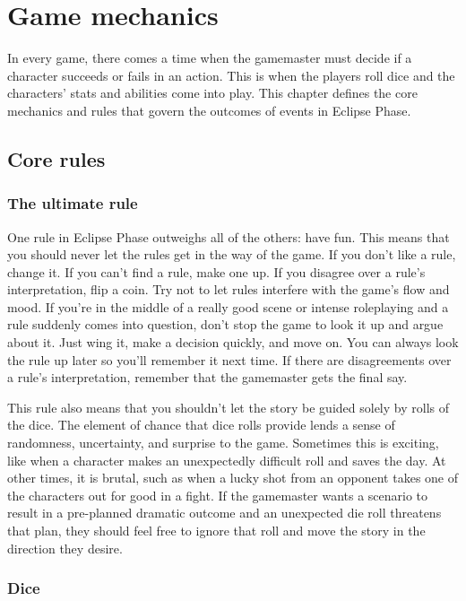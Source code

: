 \chapter{Game mechanics}
\label{chap:game-mechanics}

In every game, there comes a time when the gamemaster must decide if a
character succeeds or fails in an action. This is when the players
roll dice and the characters' stats and abilities come into play. This
chapter defines the core mechanics and rules that govern the outcomes
of events in Eclipse Phase.

\section{Core rules}
\label{sec:basics}

\subsection{The ultimate rule}
\label{sec:ultimate-rule}

One rule in Eclipse Phase outweighs all of the others: have fun. This
means that you should never let the rules get in the way of the
game. If you don't like a rule, change it. If you can't find a rule,
make one up.  If you disagree over a rule's interpretation, flip a
coin.  Try not to let rules interfere with the game's flow and
mood. If you're in the middle of a really good scene or intense
roleplaying and a rule suddenly comes into question, don't stop the
game to look it up and argue about it. Just wing it, make a decision
quickly, and move on. You can always look the rule up later so you'll
remember it next time. If there are disagreements over a rule's
interpretation, remember that the gamemaster gets the final say.

This rule also means that you shouldn't let the story be guided solely
by rolls of the dice. The element of chance that dice rolls provide
lends a sense of randomness, uncertainty, and surprise to the
game. Sometimes this is exciting, like when a character makes an
unexpectedly difficult roll and saves the day. At other times, it is
brutal, such as when a lucky shot from an opponent takes one of the
characters out for good in a fight. If the gamemaster wants a scenario
to result in a pre-planned dramatic outcome and an unexpected die roll
threatens that plan, they should feel free to ignore that roll and
move the story in the direction they desire.

\subsection{Dice}
\label{sec:dice-1}

